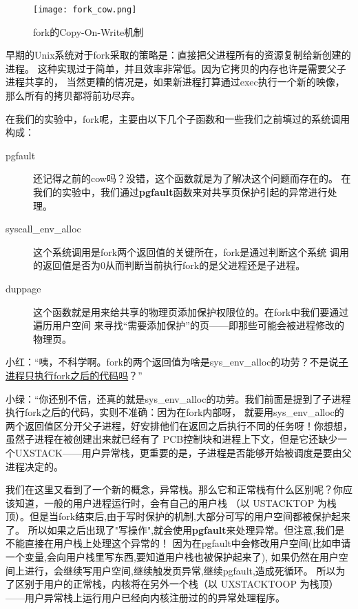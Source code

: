 \begin{figure}[htbp]
  \centering
  \texttt{[image: fork\_cow.png]}
  \caption{fork的Copy-On-Write机制}\label{fig:fork_cow} 
\end{figure}

\begin{note}
早期的Unix系统对于fork采取的策略是：直接把父进程所有的资源复制给新创建的进程。
这种实现过于简单，并且效率非常低。因为它拷贝的内存也许是需要父子进程共享的，
当然更糟的情况是，如果新进程打算通过exec执行一个新的映像，那么所有的拷贝都将前功尽弃。
\end{note}

在我们的实验中，fork呢，主要由以下几个子函数和一些我们之前填过的系统调用构成：
\begin{description}
 \item [pgfault] 还记得之前的cow吗？没错，这个函数就是为了解决这个问题而存在的。
 在我们的实验中，我们通过\textbf{pgfault}函数来对共享页保护引起的异常进行处理。
 \item [syscall\_env\_alloc] 这个系统调用是fork两个返回值的关键所在，fork是通过判断这个系统
 调用的返回值是否为0从而判断当前执行fork的是父进程还是子进程。
 \item [duppage] 这个函数就是用来给共享的物理页添加保护权限位的。在fork中我们要通过遍历用户空间
 来寻找“需要添加保护”的页——即那些可能会被进程修改的物理页。
\end{description}

\label{fork区分父子进程}
小红：“咦，不科学啊。fork的两个返回值为啥是sys\_env\_alloc的功劳？不是说\hyperref[fork与子进程]{子进程只执行fork之后的代码吗}？”

小绿：“你还别不信，还真的就是sys\_env\_alloc的功劳。我们前面是提到了子进程执行fork之后的代码，实则不准确：因为在fork内部呀，
就要用sys\_env\_alloc的两个返回值区分开父子进程，好安排他们在返回之后执行不同的任务呀！你想想，虽然子进程在被创建出来就已经有了
PCB控制块和进程上下文，但是它还缺少一个UXSTACK——用户异常栈，更重要的是，子进程是否能够开始被调度是要由父进程决定的。

我们在这里又看到了一个新的概念，异常栈。那么它和正常栈有什么区别呢？你应该知道，一般的用户进程运行时，会有自己的用户栈
（以 USTACKTOP 为栈顶）。但是当fork结束后,由于写时保护的机制,大部分可写的用户空间都被保护起来了。
所以如果之后出现了"写操作",就会使用\textbf{pgfault}来处理异常。但注意,我们是不能直接在用户栈上处理这个异常的！
因为在pgfault中会修改用户空间(比如申请一个变量,会向用户栈里写东西,要知道用户栈也被保护起来了),
如果仍然在用户空间上进行，会继续写用户空间,继续触发页异常,继续pgfault,造成死循环。
所以为了区别于用户的正常栈，内核将在另外一个栈（以 UXSTACKTOOP 为栈顶）——用户异常栈上运行用户已经向内核注册过的的异常处理程序。

